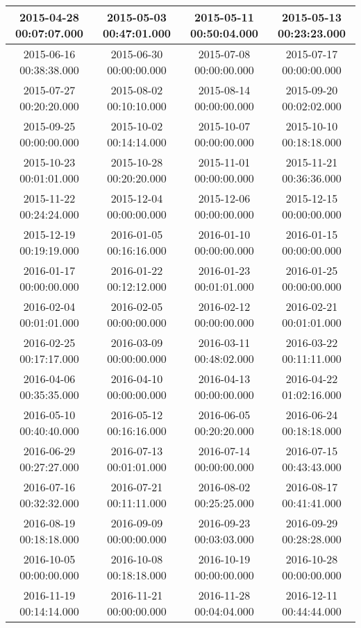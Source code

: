 \begin{longtable}{c c c c}
2015-04-28 00:07:07.000 & 
2015-05-03 00:47:01.000 & 
2015-05-11 00:50:04.000 & 
2015-05-13 00:23:23.000 \\ \midrule
2015-06-16 00:38:38.000 & 
2015-06-30 00:00:00.000 & 
2015-07-08 00:00:00.000 & 
2015-07-17 00:00:00.000 \\ \midrule
2015-07-27 00:20:20.000 & 
2015-08-02 00:10:10.000 & 
2015-08-14 00:00:00.000 & 
2015-09-20 00:02:02.000 \\ \midrule
2015-09-25 00:00:00.000 & 
2015-10-02 00:14:14.000 & 
2015-10-07 00:00:00.000 & 
2015-10-10 00:18:18.000 \\ \midrule
2015-10-23 00:01:01.000 & 
2015-10-28 00:20:20.000 & 
2015-11-01 00:00:00.000 & 
2015-11-21 00:36:36.000 \\ \midrule
2015-11-22 00:24:24.000 & 
2015-12-04 00:00:00.000 & 
2015-12-06 00:00:00.000 & 
2015-12-15 00:00:00.000 \\ \midrule
2015-12-19 00:19:19.000 & 
2016-01-05 00:16:16.000 & 
2016-01-10 00:00:00.000 & 
2016-01-15 00:00:00.000 \\ \midrule
2016-01-17 00:00:00.000 & 
2016-01-22 00:12:12.000 & 
2016-01-23 00:01:01.000 & 
2016-01-25 00:00:00.000 \\ \midrule
2016-02-04 00:01:01.000 & 
2016-02-05 00:00:00.000 & 
2016-02-12 00:00:00.000 & 
2016-02-21 00:01:01.000 \\ \midrule
2016-02-25 00:17:17.000 & 
2016-03-09 00:00:00.000 & 
2016-03-11 00:48:02.000 & 
2016-03-22 00:11:11.000 \\ \midrule
2016-04-06 00:35:35.000 & 
2016-04-10 00:00:00.000 & 
2016-04-13 00:00:00.000 & 
2016-04-22 01:02:16.000 \\ \midrule
2016-05-10 00:40:40.000 & 
2016-05-12 00:16:16.000 & 
2016-06-05 00:20:20.000 & 
2016-06-24 00:18:18.000 \\ \midrule
2016-06-29 00:27:27.000 & 
2016-07-13 00:01:01.000 & 
2016-07-14 00:00:00.000 & 
2016-07-15 00:43:43.000 \\ \midrule
2016-07-16 00:32:32.000 & 
2016-07-21 00:11:11.000 & 
2016-08-02 00:25:25.000 & 
2016-08-17 00:41:41.000 \\ \midrule
2016-08-19 00:18:18.000 & 
2016-09-09 00:00:00.000 & 
2016-09-23 00:03:03.000 & 
2016-09-29 00:28:28.000 \\ \midrule
2016-10-05 00:00:00.000 & 
2016-10-08 00:18:18.000 & 
2016-10-19 00:00:00.000 & 
2016-10-28 00:00:00.000 \\ \midrule
2016-11-19 00:14:14.000 & 
2016-11-21 00:00:00.000 & 
2016-11-28 00:04:04.000 & 
2016-12-11 00:44:44.000 \\ \midrule

\end{longtable}
